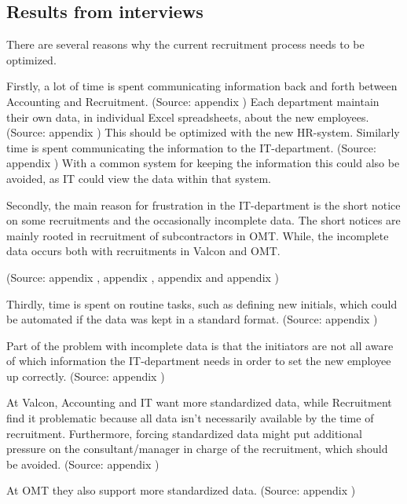\subsection{Results from interviews}
There are several reasons why the current recruitment process needs to be optimized.

Firstly, a lot of time is spent communicating information back and forth between Accounting and Recruitment. (Source: appendix )
Each department maintain their own data, in individual Excel spreadsheets, about the new employees. (Source: appendix )
This should be optimized with the new HR-system.
Similarly time is spent communicating the information to the IT-department. (Source: appendix )
With a common system for keeping the information this could also be avoided, as IT could view the data within that system.

Secondly, the main reason for frustration in the IT-department is the short notice on some recruitments and the occasionally incomplete data. 
The short notices are mainly rooted in recruitment of subcontractors in OMT.
While, the incomplete data occurs both with recruitments in Valcon and OMT.

(Source: appendix , appendix , appendix  and appendix )

Thirdly, time is spent on routine tasks, such as defining new initials, which could be automated if the data was kept in a standard format. (Source: appendix )

Part of the problem with incomplete data is that the initiators are not all aware of which information the IT-department needs in order to set the new employee up correctly. (Source: appendix )

At Valcon, Accounting and IT want more standardized data, while Recruitment find it problematic because all data isn't necessarily available by the time of recruitment.
Furthermore, forcing standardized data might put additional pressure on the consultant/manager in charge of the recruitment, which should be avoided.
(Source: appendix )

At OMT they also support more standardized data.
(Source: appendix )

